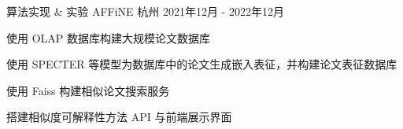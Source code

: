 \begin{cventries}
  \cventry
    {算法实现 \& 实验} %
    {AFFiNE} %
    {杭州} %
    {2021年12月 - 2022年12月} %
    {
      \begin{cvitems}
        \item {使用 OLAP 数据库构建大规模论文数据库}
        \item {使用 SPECTER 等模型为数据库中的论文生成嵌入表征，并构建论文表征数据库}
        \item {使用 Faiss 构建相似论文搜索服务}
        \item {搭建相似度可解释性方法 API 与前端展示界面}
      \end{cvitems}
    }

\end{cventries}
